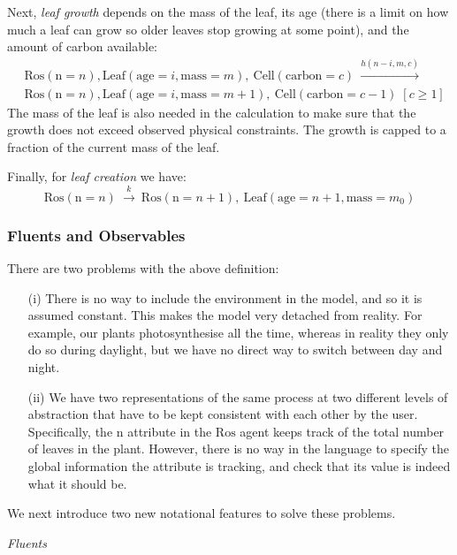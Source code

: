 Next, \textit{leaf growth} depends on the mass of the leaf, its age (there is a
limit on how much a leaf can grow so older leaves stop growing at some point),
and the amount of carbon available:
%
\begin{align*}
  & \mathrm{Ros}(\mathrm{n}=n), \mathrm{Leaf}(\mathrm{age}=i,
\mathrm{mass}=m),\: \mathrm{Cell}(\mathrm{carbon}=c) \: \xrightarrow{h(n-i, m,
    c)}\: \\
  & \mathrm{Ros}(\mathrm{n} =n), \mathrm{Leaf}(\mathrm{age}=i,
\mathrm{mass}=m+1),\: \mathrm{Cell}(\mathrm{carbon}=c-1) \; [c \geq 1]
\end{align*} The mass of the leaf is also needed in the calculation to make sure
that the growth does not exceed observed physical constraints. The growth is
capped to a fraction of the current mass of the leaf.

Finally, for \textit{leaf creation} we have:
\begin{equation*} \mathrm{Ros}(\mathrm{n}=n) \: \xrightarrow{k} \:
\mathrm{Ros}(\mathrm{n}=n+1), \: \mathrm{Leaf}(\mathrm{age}=n+1,
\mathrm{mass}=m_0)
\end{equation*}

\subsubsection*{Fluents and Observables}
There are two problems with the above definition: 
\begin{itemize}
\item[(i)] There is no way to include the environment in the model, and so it is
  assumed constant. This makes the model very detached from reality.  For
  example, our plants photosynthesise all the time, whereas in reality they only
  do so during daylight, but we have no direct way to switch between day and
  night.
\item[(ii)] We have two representations of the same process at two different
  levels of abstraction that have to be kept consistent with each other by the
  user.  Specifically, the $\mathrm{n}$ attribute in the $\mathrm{Ros}$ agent
  keeps track of the total number of leaves in the plant. However, there is no
  way in the language to specify the global information the attribute is
  tracking, and check that its value is indeed what it should be.
\end{itemize}

We next introduce two new notational features
to solve these problems.

\textit{Fluents}

